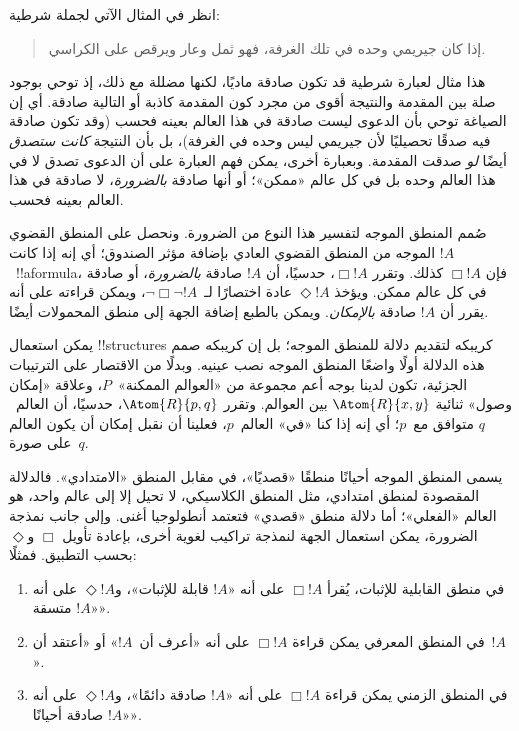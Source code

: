 \documentclass[../../../include/open-logic-section]{subfiles}
\begin{document}


انظر في المثال الآتي لجملة شرطية:
\begin{quote}
  إذا كان جيريمي وحده في تلك الغرفة، فهو ثمل وعار ويرقص على الكراسي.
\end{quote}
هذا مثال لعبارة شرطية قد تكون صادقة ماديًا، لكنها مضللة مع ذلك، إذ
توحي بوجود صلة بين المقدمة والنتيجة أقوى من مجرد كون المقدمة كاذبة أو
التالية صادقة. أي إن الصياغة توحي بأن الدعوى ليست صادقة في هذا العالم
بعينه فحسب (وقد تكون صادقة فيه صدقًا تحصيليًا لأن جيريمي ليس وحده في
الغرفة)، بل بأن النتيجة \emph{كانت ستصدق} أيضًا \emph{لو} صدقت
المقدمة. وبعبارة أخرى، يمكن فهم العبارة على أن الدعوى تصدق لا في هذا
العالم وحده بل في كل عالم «ممكن»؛ أو أنها صادقة \emph{بالضرورة}، لا
صادقة في هذا العالم بعينه فحسب.

صُمم المنطق الموجه لتفسير هذا النوع من الضرورة. ونحصل على المنطق
القضوي الموجه من المنطق القضوي العادي بإضافة مؤثر الصندوق؛ أي إنه إذا
كانت $!A$~!!a{formula}، فإن $\Box !A$ كذلك. وتقرر $\Box !A$، حدسيًا،
أن $!A$ صادقة \emph{بالضرورة}، أو صادقة في كل عالم ممكن. ويؤخذ
$\Diamond !A$ عادة اختصارًا لـ~$\lnot \Box \lnot !A$، ويمكن قراءته
على أنه يقرر أن $!A$ صادقة \emph{بالإمكان}. ويمكن بالطبع إضافة الجهة
إلى منطق المحمولات أيضًا.

يمكن استعمال !!{structure}s كريبكه لتقديم دلالة للمنطق الموجه؛ بل إن
كريبكه صمم هذه الدلالة أولًا واضعًا المنطق الموجه نصب عينيه. وبدلًا من
الاقتصار على الترتيبات الجزئية، تكون لدينا بوجه أعم مجموعة من «العوالم
الممكنة»~$P$، وعلاقة «إمكان وصول» ثنائية $\Atom{R}{x,y}$ بين العوالم.
وتقرر $\Atom{R}{p,q}$، حدسيًا، أن العالم~$q$ متوافق مع~$p$؛ أي إنه إذا
كنا «في» العالم~$p$، فعلينا أن نقبل إمكان أن يكون العالم على صورة~$q$.

يسمى المنطق الموجه أحيانًا منطقًا «قصديًا»، في مقابل المنطق
«الامتدادي». فالدلالة المقصودة لمنطق امتدادي، مثل المنطق الكلاسيكي، لا
تحيل إلا إلى عالم واحد، هو العالم «الفعلي»؛ أما دلالة منطق «قصدي»
فتعتمد أنطولوجيا أغنى. وإلى جانب نمذجة الضرورة، يمكن استعمال الجهة
لنمذجة تراكيب لغوية أخرى، بإعادة تأويل $\Box$ و$\Diamond$ بحسب
التطبيق. فمثلًا:
\begin{enumerate}
\item في منطق القابلية للإثبات، يُقرأ $\Box !A$ على أنه «$!A$ قابلة
  للإثبات»، و$\Diamond !A$ على أنه «$!A$ متسقة».
\item في المنطق المعرفي يمكن قراءة $\Box !A$ على أنه «أعرف أن~$!A$»
  أو «أعتقد أن~$!A$».
\item في المنطق الزمني يمكن قراءة $\Box !A$ على أنه «$!A$ صادقة
  دائمًا»، و$\Diamond !A$ على أنه «$!A$ صادقة أحيانًا».
\end{enumerate}
\end{document}

